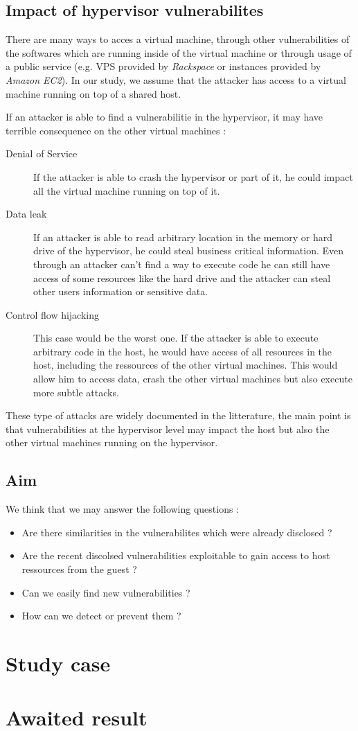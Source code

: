 \subsection{Impact of hypervisor vulnerabilites}
There are many ways to acces a virtual machine, through other vulnerabilities of
the softwares which are running inside of the virtual machine or through
usage of a public service (e.g. VPS provided by \emph{Rackspace} or instances
provided by \emph{Amazon EC2}).
In our study, we assume that the attacker has access to a virtual machine
running on top of a shared host.

If an attacker is able to find a vulnerabilitie in the hypervisor, it may have
terrible consequence on the other virtual machines :
\begin{description}
\item[Denial of Service] If the attacker is able to crash the hypervisor or part
of it, he could impact all the virtual machine running on top of it.
\item[Data leak] If an attacker is able to read arbitrary location in the memory
or hard drive of the hypervisor, he could steal business critical information.
Even through an attacker can't find a way to execute code he can still have
access of some resources like the hard drive and the attacker can steal
other users information or sensitive data.
\item[Control flow hijacking] This case would be the worst one. If the attacker
is able to execute arbitrary code in the host, he would have access of all
resources in the host, including the ressources of the other virtual machines.
This would allow him to access data, crash the other virtual machines but also
execute more subtle attacks.
\end{description}

These type of attacks are widely documented in the litterature, the main point is
that vulnerabilities at the hypervisor level may impact the host but also the other
virtual machines running on the hypervisor.

\subsection{Aim}
We think that we may answer the following questions :
\begin{itemize}
\item Are there similarities in the vulnerabilites which were already disclosed ?
\item Are the recent discolsed vulnerabilities exploitable to gain access to host
ressources from the guest ?
\item Can we easily find new vulnerabilities ?
\item How can we detect or prevent them ?
\end{itemize}

\section{Study case}

\section{Awaited result}
